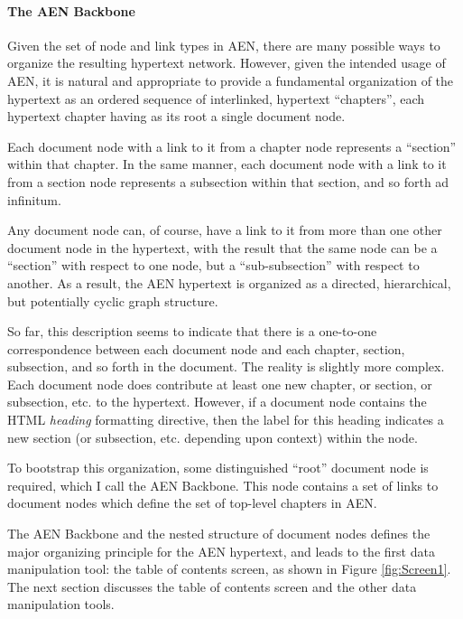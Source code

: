 \paragraph{The AEN Backbone}
\label{sec:aen-backbone}

Given the set of node and link types in AEN, there are many possible ways
to organize the resulting hypertext network.  However, given the intended
usage of AEN, it is natural and appropriate to provide a fundamental
organization of the hypertext as an ordered sequence of interlinked,
hypertext ``chapters'', each hypertext chapter having as its root a single
document node.

Each document node with a link to it from a chapter node represents a
``section'' within that chapter. In the same manner, each document node
with a link to it from a section node represents a subsection within that
section, and so forth ad infinitum.

Any document node can, of course, have a link to it from more than one
other document node in the hypertext, with the result that the same node
can be a ``section'' with respect to one node, but a ``sub-subsection''
with respect to another.  As a result, the AEN hypertext is organized as a
directed, hierarchical, but potentially cyclic graph structure.

So far, this description seems to indicate that there is a one-to-one
correspondence between each document node and each chapter, section,
subsection, and so forth in the document.  The reality is slightly more
complex.  Each document node does contribute at least one new chapter, or
section, or subsection, etc. to the hypertext.  However, if a document
node contains the HTML {\em heading} formatting directive, then the label for
this heading indicates a new section (or subsection, etc. depending upon
context) within the node.

To bootstrap this organization, some distinguished ``root'' document node
is required, which I call the AEN Backbone.  This node contains a set of
links to document nodes which define the set of top-level chapters in AEN.

The AEN Backbone and the nested structure of document nodes defines the
major organizing principle for the AEN hypertext, and leads to the first
data manipulation tool: the table of contents screen, as shown in Figure
\ref{fig:Screen1}.  The next section discusses the table of contents screen
and the other data manipulation tools. 



